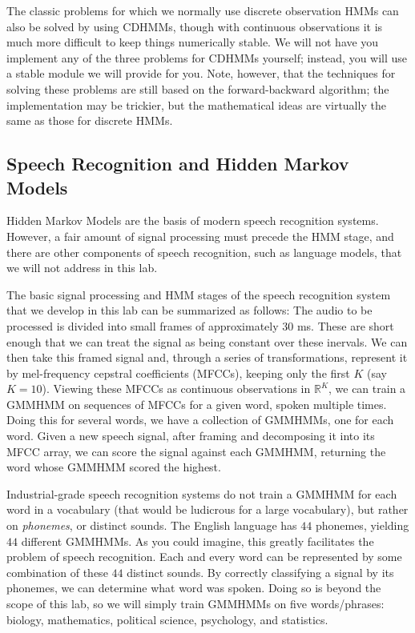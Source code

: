 The classic problems for which we normally use discrete observation HMMs can also be solved by using CDHMMs, though with continuous observations it is much more difficult to keep things numerically stable.
We will not have you implement any of the three problems for CDHMMs yourself; instead, you will use a stable module we will provide for you.
Note, however, that the techniques for solving these problems are still based on the forward-backward algorithm; the implementation may be trickier, but the mathematical
ideas are virtually the same as those for discrete HMMs.

\subsection*{Speech Recognition and Hidden Markov Models}
Hidden Markov Models are the basis of modern speech recognition systems. However, a fair amount of signal processing must precede the HMM stage, and there are other
components of speech recognition, such as language models, that we will not address in this lab.

The basic signal processing and HMM stages of the speech recognition system that we develop in this lab can be summarized as follows:
The audio to be processed is divided into small frames of approximately $30$ ms. These are short enough that we can treat the signal as being constant over these inervals. We can then take this framed signal and, through a series of transformations, represent it by mel-frequency cepstral coefficients (MFCCs), keeping only the first $K$ (say $K = 10$). Viewing these MFCCs as continuous observations in $\mathbb{R}^{K}$, we can train a GMMHMM on sequences of MFCCs for a given word, spoken multiple times. Doing this for several words, we have a collection of GMMHMMs, one for each word. Given a new speech signal, after framing and decomposing it into its MFCC array, we can score the signal against each GMMHMM, returning the word whose GMMHMM scored the highest.

Industrial-grade speech recognition systems do not train a GMMHMM for each word in a vocabulary (that would be ludicrous for a large vocabulary), but rather on \emph{phonemes}, or distinct sounds. The English language has $44$ phonemes, yielding $44$ different GMMHMMs. As you could imagine, this greatly facilitates the problem of speech recognition.  Each and every word can be represented by some combination of these $44$ distinct sounds.  By correctly classifying a signal by its phonemes, we can determine what word was spoken. Doing so is beyond the scope of this lab, so we will simply train GMMHMMs on five words/phrases: biology, mathematics, political science, psychology, and statistics.

